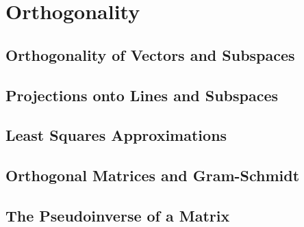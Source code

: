 \chapter{Orthogonality}

\section{Orthogonality of Vectors and Subspaces}

\section{Projections onto Lines and Subspaces}

\section{Least Squares Approximations}

\section{Orthogonal Matrices and Gram-Schmidt}

\section{The Pseudoinverse of a Matrix}
